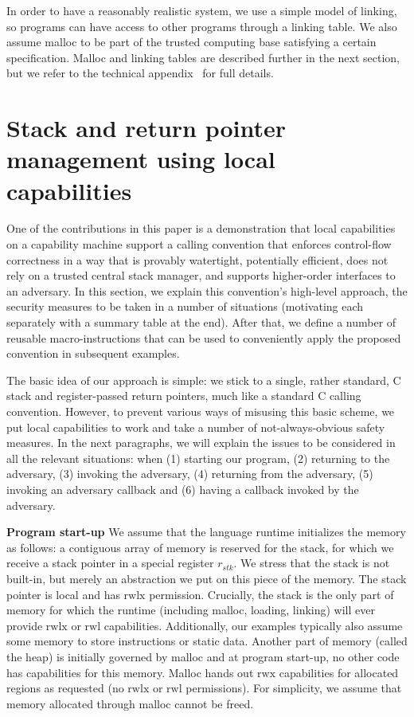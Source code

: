 \documentclass[compsoc,conference,letterpaper,fleqn]{IEEEtran}
\newcommand{\var}[1]{\mathit{#1}}
\newcommand{\stk}{\var{stk}}
\newcommand{\plainperm}[1]{\mathrm{#1}}
\newcommand{\rwx}{\plainperm{rwx}}
\newcommand{\readwritel}{\plainperm{rwl}}
\newcommand{\rwl}{\readwritel}
\newcommand{\rwlx}{\plainperm{rwlx}}
\begin{document}

In order to have a reasonably realistic system, we use a simple model of
linking, so programs can have access to other programs through a linking table.
We also assume malloc to be part of the trusted computing base satisfying a
certain specification. Malloc and linking tables are described further in the
next section, but we refer to the technical appendix~\citep{technical_appendix}
for full details.

\section{Stack and return pointer management using local capabilities}
\label{sec:stack-and-return-pointer}
One of the contributions in this paper is a demonstration that local
capabilities on a capability machine support a calling convention that enforces
control-flow correctness in a way that is provably watertight, potentially
efficient, does not rely on a trusted central stack manager, and supports
higher-order interfaces to an adversary. In this section, we explain this
convention's high-level approach, the security measures to be taken in a number
of situations (motivating each separately with a summary table at the end).
After that, we define a number of reusable macro-instructions that can be used
to conveniently apply the proposed convention in subsequent examples.

The basic idea of our approach is simple: we stick to a single, rather standard,
C stack and register-passed return pointers, much like a standard C calling
convention. However, to prevent various ways of misusing this basic scheme, we
put local capabilities to work and take a number of not-always-obvious safety
measures. In the next paragraphs, we will explain the issues to be considered in
all the relevant situations: when (1) starting our program, (2) returning to the
adversary, (3) invoking the adversary, (4) returning from the adversary, (5)
invoking an adversary callback and (6) having a callback invoked by the
adversary.

\textbf{Program start-up} We assume that the language runtime initializes the
memory as follows: a contiguous array of memory is reserved for the stack, for
which we receive a stack pointer in a special register $r_\stk$. We stress that
the stack is not built-in, but merely an abstraction we put on this piece of the
memory. The stack pointer is local and has $\rwlx$ permission. Crucially, the
stack is the only part of memory for which the runtime (including malloc,
loading, linking) will ever provide $\rwlx$ or $\rwl$ capabilities.
Additionally, our examples typically also assume some memory to store
instructions or static data. Another part of memory (called the heap) is
initially governed by malloc and at program start-up, no other code has
capabilities for this memory. Malloc hands out $\rwx$ capabilities for allocated
regions as requested (no $\rwlx$ or $\rwl$ permissions). For simplicity, we
assume that memory allocated through malloc cannot be freed.
\end{document}

